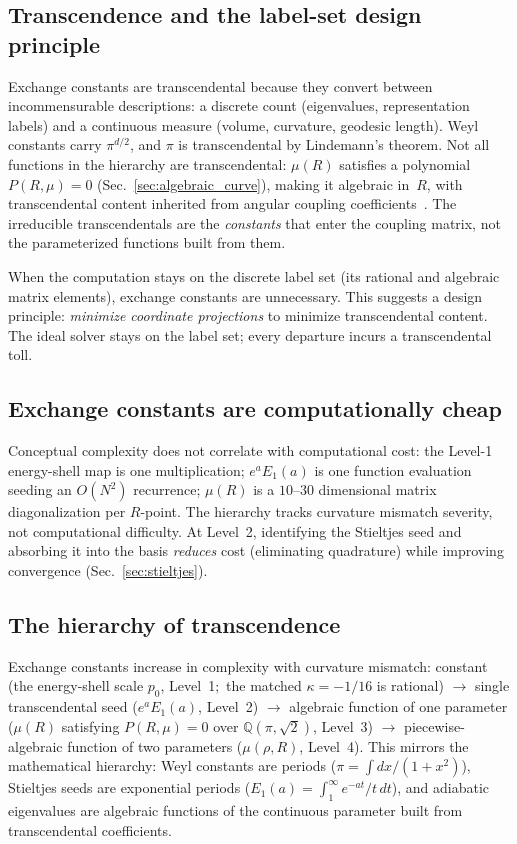 \documentclass[aps,pra,twocolumn,superscriptaddress,longbibliography]{revtex4-2}
\begin{document}
\subsection{Transcendence and the label-set design principle}

Exchange constants are transcendental because they convert between
incommensurable descriptions: a discrete count (eigenvalues,
representation labels) and a continuous measure (volume, curvature,
geodesic length).  Weyl constants carry $\pi^{d/2}$, and $\pi$ is
transcendental by Lindemann's theorem.  Not all functions in the
hierarchy are transcendental: $\mu(R)$ satisfies a polynomial $P(R,\mu) = 0$
(Sec.~\ref{sec:algebraic_curve}), making it algebraic in~$R$, with
transcendental content inherited from angular coupling
coefficients~\cite{berger2003}.  The irreducible transcendentals are
the \emph{constants} that enter the coupling matrix, not the
parameterized functions built from them.

When the computation stays on the discrete label set (its rational
and algebraic matrix elements), exchange constants are unnecessary.
This suggests a design principle: \textit{minimize coordinate
projections} to minimize transcendental content.  The ideal solver
stays on the label set; every departure incurs a transcendental toll.

\subsection{Exchange constants are computationally cheap}

Conceptual complexity does not correlate with computational cost:
the Level-1 energy-shell map is one multiplication; $e^a E_1(a)$ is one function
evaluation seeding an $O(N^2)$ recurrence; $\mu(R)$ is a
$10$--$30$ dimensional matrix diagonalization per $R$-point.
The hierarchy tracks curvature mismatch severity, not computational
difficulty.  At Level~2, identifying the Stieltjes seed and absorbing
it into the basis \emph{reduces} cost (eliminating quadrature) while
improving convergence (Sec.~\ref{sec:stieltjes}).

\subsection{The hierarchy of transcendence}

Exchange constants increase in complexity with curvature mismatch:
constant (the energy-shell scale $p_0$, Level~1;\ the matched
$\kappa = -1/16$ is rational) $\to$ single transcendental
seed ($e^a E_1(a)$, Level~2) $\to$ algebraic function of one
parameter ($\mu(R)$ satisfying $P(R,\mu) = 0$ over
$\mathbb{Q}(\pi,\sqrt{2})$, Level~3) $\to$ piecewise-algebraic
function of two parameters ($\mu(\rho,R)$, Level~4).  This mirrors
the mathematical hierarchy: Weyl constants are periods
($\pi = \int dx/(1+x^2)$), Stieltjes seeds are exponential periods
($E_1(a) = \int_1^\infty e^{-at}/t\,dt$), and adiabatic eigenvalues
are algebraic functions of the continuous parameter built from
transcendental coefficients.
\end{document}
